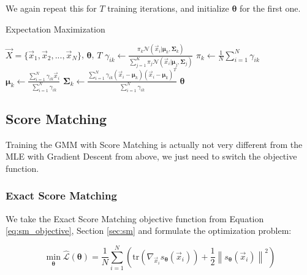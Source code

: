 We again repeat this for $T$ training iterations, and initialize $\boldsymbol{\theta}$ for the first one.  \\

\begin{algorithm}
    \caption{Expectation Maximization}
    \label{alg:em_gmm}
    \begin{algorithmic}[1]  
        \Require $\vec X = \{\vec x_1, \vec x_2, ..., \vec x_N\}$, $\boldsymbol{\theta}$, $T$
                    \State $\gamma_{ik} \gets \frac{\pi_k \mathcal{N}(\vec{x}_i|\boldsymbol{\mu}_k, \boldsymbol{\Sigma}_k)}{\sum_{j=1}^{K} \pi_j \mathcal{N}(\vec{x}_i|\boldsymbol{\mu}_j, \boldsymbol{\Sigma}_j)}$
                \EndFor
            \EndFor
                \State $\pi_k \gets \frac{1}{N} \sum_{i=1}^{N} \gamma_{ik}$
                \State $\boldsymbol{\mu}_k \gets \frac{\sum_{i=1}^{N} \gamma_{ik} \vec{x}_i}{\sum_{i=1}^{N} \gamma_{ik}}$
                \State $\boldsymbol{\Sigma}_k \gets \frac{\sum_{i=1}^{N} \gamma_{ik} (\vec{x}_i - \boldsymbol{\mu}_k)(\vec{x}_i - \boldsymbol{\mu}_k)^T}{\sum_{i=1}^{N} \gamma_{ik}}$
            \EndFor
        \EndFor
        \State \Return $\boldsymbol{\theta}$
    \end{algorithmic}
\end{algorithm}

\newpage
\subsection{Score Matching}
\label{sec:gmm_sm}

Training the GMM with Score Matching is actually not very different from the MLE with Gradient Descent from above, we just need 
to switch the objective function.  

\subsubsection{Exact Score Matching}

We take the Exact Score Matching objective function from Equation \ref{eq:sm_objective}, Section \ref{sec:sm} and formulate the optimization problem:

\begin{equation}
    \min_{\substack{\boldsymbol{\theta}}} \hat{\mathcal{L}}(\boldsymbol{\theta}) = \frac{1}{N} \sum_{i=1}^{N} \left(\text{tr} \left( \nabla_{\vec x_i} s_{\boldsymbol{\theta}}(\vec x_i) \right) + \frac{1}{2} \left\| s_{\boldsymbol{\theta}}(\vec x_i) \right\|^2 \right)
    \label{eq:sm_optimization_problem}
\end{equation}


